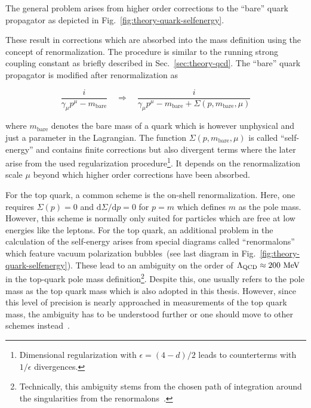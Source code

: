 The general problem arises from higher order corrections to the ``bare'' quark propagator as depicted in Fig.~\ref{fig:theory-quark-selfenergy}. 


These result in corrections which are absorbed into the mass definition using the concept of renormalization. The procedure is similar to the running strong coupling constant as briefly described in Sec.~\ref{sec:theory-qcd}. The ``bare'' quark propagator is modified after renormalization as

\begin{equation}
\frac{i}{\gamma_{\mu}p^{\mu}-m_\mathrm{bare}}\quad\Rightarrow\quad\frac{i}{\gamma_{\mu}p^{\mu}-m_\mathrm{bare}+\Sigma(p,m_\mathrm{bare},\mu)}
\end{equation}

where $m_\mathrm{bare}$ denotes the bare mass of a quark which is however unphysical and just a parameter in the Lagrangian. The function $\Sigma(p,m_\mathrm{bare},\mu)$ is called ``self-energy'' and contains finite corrections but also divergent terms where the later arise from the used regularization procedure\footnote{Dimensional regularization with $\epsilon=(4-d)/2$ leads to counterterms with $1/\epsilon$ divergences.}. It depends on the renormalization scale $\mu$ beyond which higher order corrections have been absorbed.

For the top quark, a common scheme is the on-shell renormalization. Here, one requires $\Sigma(p)=0$ and $\mathrm{d}\Sigma/\mathrm{d}p=0$ for $p=m$ which defines $m$ as the pole mass. However, this scheme is normally only suited for particles which are free at low energies like the leptons. For the top quark, an additional problem in the calculation of the self-energy arises from special diagrams called ``renormalons'' which feature vacuum polarization bubbles~(see last diagram in Fig.~\ref{fig:theory-quark-selfenergy}). These lead to an ambiguity on the order of $\Lambda_\mathrm{QCD}\approx200~\mathrm{MeV}$ in the top-quark pole mass definition\footnote{Technically, this ambiguity stems from the chosen path of integration around the singularities from the renormalons~\cite{Smith:1996xz}.}. Despite this, one usually refers to the pole mass as the top quark mass which is also adopted in this thesis. However, since this level of precision is nearly approached in measurements of the top quark mass, the ambiguity has to be understood further or one should move to other schemes instead~\cite{Smith:1996xz}.

